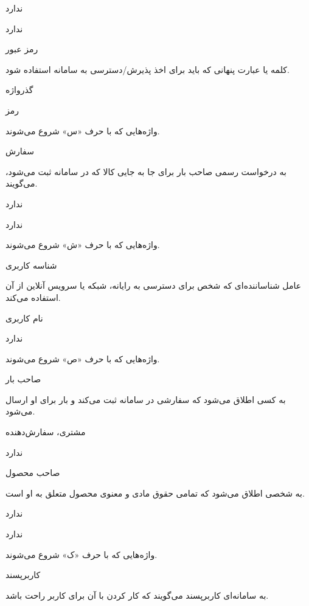 ندارد

ندارد

\noindent \hrulefill

رمز عبور

کلمه یا عبارت پنهانی که باید برای اخذ پذیرش/دسترسی  به سامانه استفاده شود.

گذرواژه

رمز

\newpage

واژه‌هایی که با حرف «س» شروع می‌شوند.
\noindent \hrulefill

سفارش

به درخواست رسمی صاحب بار برای جا به جایی کالا که در سامانه ثبت می‌شود، می‌گویند.

ندارد

ندارد

\newpage

واژه‌هایی که با حرف «ش» شروع می‌شوند.
\noindent \hrulefill

شناسه کاربری

عامل شناساننده‌ای که شخص برای دسترسی به رایانه، شبکه یا سرویس آنلاین از آن استفاده می‌کند.

نام کاربری

ندارد

\newpage

واژه‌هایی که با حرف «ص» شروع می‌شوند.
\noindent \hrulefill

صاحب بار

به کسی اطلاق می‌شود که سفارشی در سامانه ثبت می‌کند و بار برای او ارسال می‌شود.

مشتری، سفارش‌دهنده

ندارد

\noindent \hrulefill

صاحب محصول

به شخصی اطلاق می‌شود که تمامی حقوق مادی و معنوی محصول متعلق به او است.

ندارد

ندارد

\newpage

واژه‌هایی که با حرف «ک» شروع می‌شوند.
\noindent \hrulefill

کاربرپسند

به سامانه‌ای کاربرپسند می‌گویند که کار کردن با آن برای کاربر راحت باشد.

